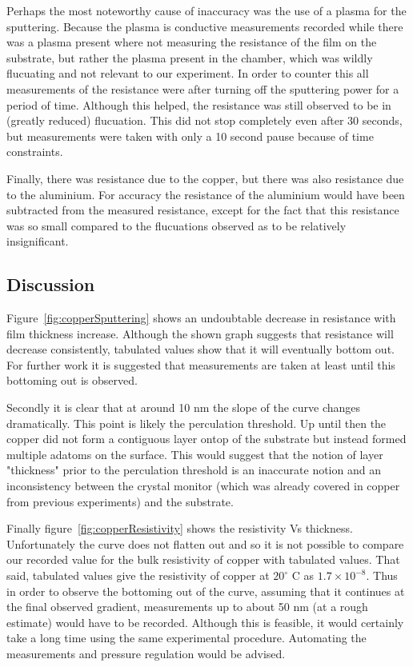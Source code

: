 \documentclass[aps,prl,twocolumn,groupedaddress,showkeys]{revtex4}
\begin{document}
Perhaps the most noteworthy cause of inaccuracy was the use of a plasma for the sputtering. Because the plasma is conductive measurements recorded while there was a plasma present where not measuring the resistance of the film on the substrate, but rather the plasma present in the chamber, which was wildly flucuating and not relevant to our experiment. In order to counter this all measurements of the resistance were after turning off the sputtering power for a period of time. Although this helped, the resistance was still observed to be in (greatly reduced) flucuation. This did not stop completely even after 30 seconds, but measurements were taken with only a 10 second pause because of time constraints. 

Finally, there was resistance due to the copper, but there was also resistance due to the aluminium. For accuracy the resistance of the aluminium would have been subtracted from the measured resistance, except for the fact that this resistance was so small compared to the flucuations observed as to be relatively insignificant.

\subsection{Discussion}

Figure~\ref{fig:copperSputtering} shows an undoubtable decrease in resistance with film thickness increase. Although the shown graph suggests that resistance will decrease consistently, tabulated values show that it will eventually bottom out. For further work it is suggested that measurements are taken at least until this bottoming out is observed.

Secondly it is clear that at around 10 nm the slope of the curve changes dramatically. This point is likely the perculation threshold. Up until then the copper did not form a contiguous layer ontop of the substrate but instead formed multiple adatoms on the surface. This would suggest that the notion of layer "thickness" prior to the perculation threshold is an inaccurate notion and an inconsistency between the crystal monitor (which was already covered in copper from previous experiments) and the substrate.

Finally figure~\ref{fig:copperResistivity} shows the resistivity Vs thickness. Unfortunately the curve does not flatten out and so it is not possible to compare our recorded value for the bulk resistivity of copper with tabulated values. That said, tabulated values give the resistivity of copper at $20^{\circ}$ C as $1.7\times10^{-8}$\cite{griffiths}. Thus in order to observe the bottoming out of the curve, assuming that it continues at the final observed gradient, measurements up to about 50 nm (at a rough estimate) would have to be recorded. Although this is feasible, it would certainly take a long time using the same experimental procedure. Automating the measurements and pressure regulation would be advised.
\end{document}
